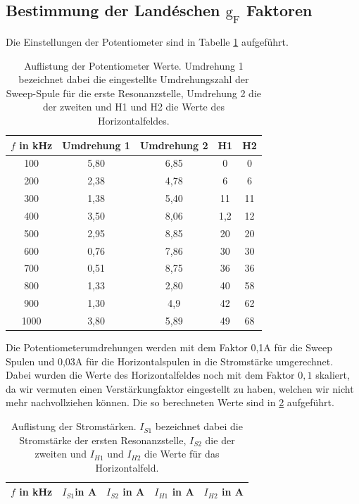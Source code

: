 \subsection{Bestimmung der Landéschen $\text{g}_{\text{F}}$ Faktoren}
Die Einstellungen der Potentiometer sind in Tabelle \ref{tab:Potentiometer} aufgeführt.
\begin{table}[H]
    \centering
    \caption{Auflistung der Potentiometer Werte. Umdrehung 1 bezeichnet dabei die eingestellte Umdrehungszahl der Sweep-Spule für die
    erste Resonanzstelle, Umdrehung 2 die der zweiten und H1 und H2 die Werte des Horizontalfeldes.}
    \label{tab:Potentiometer}
    \begin{tabular}{c|c|c|c|c}
        \toprule
        $f$ in kHz & Umdrehung 1 & Umdrehung 2 & H1 & H2  \\
        \midrule
        100& 5,80 &6,85& 0 & 0 \\
        200& 2,38 &4,78& 6& 6\\
        300& 1,38 &5,40& 11 &11\\
        400& 3,50 &8,06& 1,2 &12\\
        500& 2,95 &8,85& 20 &20\\
        600& 0,76 &7,86& 30 &30\\
        700& 0,51 &8,75& 36 &36\\
        800& 1,33 &2,80& 40 &58\\
        900& 1,30  &4,9 &42 &62\\
        1000& 3,80 &5,89& 49& 68\\
        \bottomrule
    \end{tabular}
\end{table}
Die Potentiometerumdrehungen werden mit dem Faktor 0,1A für die Sweep Spulen und
0,03A für die Horizontalspulen in die Stromstärke umgerechnet. Dabei wurden die Werte des Horizontalfeldes
noch mit dem Faktor $0,1$ skaliert, da wir vermuten einen Verstärkungfaktor eingestellt zu haben,
welchen wir nicht mehr nachvollziehen können. Die so berechneten Werte sind in
\ref{tab:Umrechnung} aufgeführt.
\begin{table}[H]
    \centering
    \caption{Auflistung der Stromstärken. $I_{S1}$ bezeichnet dabei die Stromstärke der
    ersten Resonanzstelle, $I_{S2}$ die der zweiten und $I_{H1}$ und $I_{H2}$ die Werte für das Horizontalfeld.}
    \label{tab:Umrechnung}
    \begin{tabular}{c|c|c|c|c}
        \toprule
        $f$ in kHz & $I_{S1}$in A & $I_{S2}$ in A & $I_{H1}$ in A  & $I_{H2}$ in A   \\
        \midrule
        
        \bottomrule
    \end{tabular}
\end{table}
